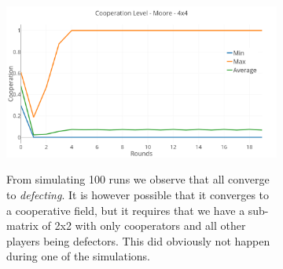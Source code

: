 \documentclass[a4paper, 11pt]{article}
\begin{document}
\begin{landscape}
\begin{figure}[H]
\begin{subfigure}{.95\textwidth}
	\includegraphics[width=1\linewidth]{PDMoore8x8}
\end{subfigure}%
\begin{subfigure}{.5\textwidth}
	From simulating 100 runs we observe that all converge to \textit{defecting}. It is however possible that it converges to a cooperative field, but it requires that we have a sub-matrix of 2x2 with only cooperators and all other players being defectors. This did obviously not happen during one of the simulations.
\end{subfigure}%
\end{figure}


\newpage


\end{landscape}
\end{document}
